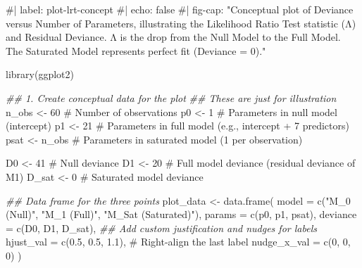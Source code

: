 \documentclass[
  letterpaper,
]{scrbook}
\newenvironment{Shaded}{\begin{snugshade}}{\end{snugshade}}
\newcommand{\AttributeTok}[1]{\textcolor[rgb]{0.40,0.45,0.13}{#1}}
\newcommand{\CommentTok}[1]{\textcolor[rgb]{0.37,0.37,0.37}{#1}}
\newcommand{\DecValTok}[1]{\textcolor[rgb]{0.68,0.00,0.00}{#1}}
\newcommand{\DocumentationTok}[1]{\textcolor[rgb]{0.37,0.37,0.37}{\textit{#1}}}
\newcommand{\FloatTok}[1]{\textcolor[rgb]{0.68,0.00,0.00}{#1}}
\newcommand{\FunctionTok}[1]{\textcolor[rgb]{0.28,0.35,0.67}{#1}}
\newcommand{\NormalTok}[1]{\textcolor[rgb]{0.00,0.23,0.31}{#1}}
\newcommand{\OtherTok}[1]{\textcolor[rgb]{0.00,0.23,0.31}{#1}}
\newcommand{\StringTok}[1]{\textcolor[rgb]{0.13,0.47,0.30}{#1}}
\begin{document}
\begin{Shaded}
\begin{Highlighting}[]
\CommentTok{\#| label: plot{-}lrt{-}concept}
\CommentTok{\#| echo: false}
\CommentTok{\#| fig{-}cap: "Conceptual plot of Deviance versus Number of Parameters, illustrating the Likelihood Ratio Test statistic (Λ) and Residual Deviance. Λ is the drop from the Null Model to the Full Model. The Saturated Model represents perfect fit (Deviance = 0)."}

\FunctionTok{library}\NormalTok{(ggplot2)}

\DocumentationTok{\#\# 1. Create conceptual data for the plot}
\DocumentationTok{\#\# These are just for illustration}
\NormalTok{n\_obs }\OtherTok{\textless{}{-}} \DecValTok{60} \CommentTok{\# Number of observations}
\NormalTok{p0 }\OtherTok{\textless{}{-}} \DecValTok{1}     \CommentTok{\# Parameters in null model (intercept)}
\NormalTok{p1 }\OtherTok{\textless{}{-}} \DecValTok{21}    \CommentTok{\# Parameters in full model (e.g., intercept + 7 predictors)}
\NormalTok{psat }\OtherTok{\textless{}{-}}\NormalTok{ n\_obs }\CommentTok{\# Parameters in saturated model (1 per observation)}

\NormalTok{D0 }\OtherTok{\textless{}{-}} \DecValTok{41} \CommentTok{\# Null deviance}
\NormalTok{D1 }\OtherTok{\textless{}{-}} \DecValTok{20} \CommentTok{\# Full model deviance (residual deviance of M1)}
\NormalTok{D\_sat }\OtherTok{\textless{}{-}} \DecValTok{0} \CommentTok{\# Saturated model deviance}

\DocumentationTok{\#\# Data frame for the three points}
\NormalTok{plot\_data }\OtherTok{\textless{}{-}} \FunctionTok{data.frame}\NormalTok{(}
  \AttributeTok{model =} \FunctionTok{c}\NormalTok{(}\StringTok{"M\_0 (Null)"}\NormalTok{, }\StringTok{"M\_1 (Full)"}\NormalTok{, }\StringTok{"M\_Sat (Saturated)"}\NormalTok{),}
  \AttributeTok{params =} \FunctionTok{c}\NormalTok{(p0, p1, psat),}
  \AttributeTok{deviance =} \FunctionTok{c}\NormalTok{(D0, D1, D\_sat),}
  \DocumentationTok{\#\# Add custom justification and nudges for labels}
  \AttributeTok{hjust\_val =} \FunctionTok{c}\NormalTok{(}\FloatTok{0.5}\NormalTok{, }\FloatTok{0.5}\NormalTok{, }\FloatTok{1.1}\NormalTok{), }\CommentTok{\# Right{-}align the last label}
  \AttributeTok{nudge\_x\_val =} \FunctionTok{c}\NormalTok{(}\DecValTok{0}\NormalTok{, }\DecValTok{0}\NormalTok{, }\DecValTok{0}\NormalTok{) }
\NormalTok{)}


\end{Highlighting}
\end{Shaded}
\end{document}

